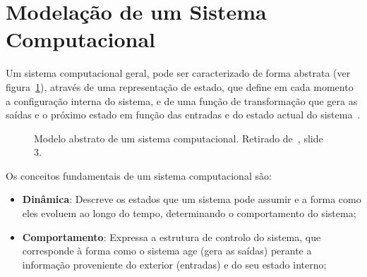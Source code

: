 \section{Modelação de um Sistema Computacional}\label{sec:modelacao-de-um-sistema-computacional}

Um sistema computacional geral, pode ser caracterizado de forma abstrata (ver figura~\ref{fig:sistema-computacional-abstrato}), através de uma representação de estado, que define em cada momento a configuração interna do
sistema, e de uma função de transformação que gera as saídas e o próximo estado em
função das entradas e do estado actual do sistema~\cite{isel:iasa:slides:intro-eng-soft-parte-3}.

\begin{figure}[H]
    \begin{center}
    \end{center}
    \caption{Modelo abstrato de um sistema computacional.
    Retirado de~\cite{isel:iasa:slides:intro-eng-soft-parte-3}, slide 3.}\label{fig:sistema-computacional-abstrato}
\end{figure}

Os conceitos fundamentais de um sistema computacional são:

\begin{itemize}
    \item \textbf{Dinâmica}: Descreve os estados que um sistema pode assumir
    e a forma como eles evoluem ao longo do tempo,
    determinando o comportamento do sistema;
    \item \textbf{Comportamento}: Expressa a estrutura de controlo do sistema, que corresponde à forma como o sistema age (gera as
    saídas) perante a informação proveniente do
    exterior (entradas) e do seu estado interno;
\end{itemize}

